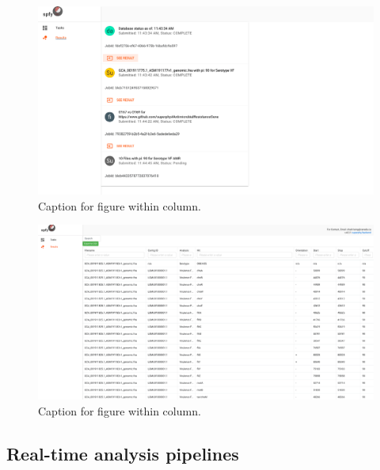 \documentclass[a4,center,fleqn]{NAR}
\begin{document}
\begin{figure}[t]
\begin{center}
\includegraphics{images/results.png}
\end{center}
\caption{Caption for figure within column.}
\label{fig-results}
\end{figure}

\begin{figure}[t]
\begin{center}
\includegraphics{images/tables.png}
\end{center}
\caption{Caption for figure within column.}
\label{fig-tables}
\end{figure}

\subsection{Real-time analysis pipelines}
\end{document}
